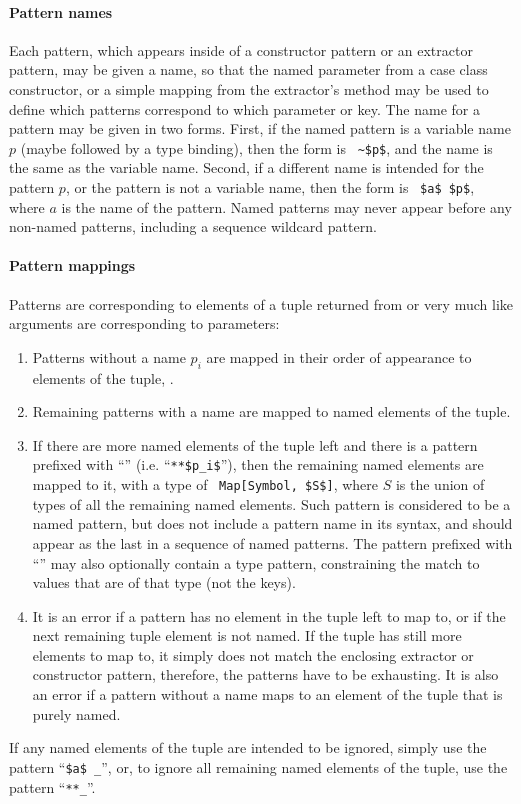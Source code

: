 \paragraph{Pattern names}
Each pattern, which appears inside of a constructor pattern or an extractor pattern, may be given a name, so that the named parameter from a case class constructor, or a simple mapping from the extractor's  method may be used to define which patterns correspond to which parameter or key. The name for a pattern may be given in two forms. First, if the named pattern is a variable name $p$ (maybe followed by a type binding), then the form is ~\lstinline!~$p$!, and the name is the same as the variable name. Second, if a different name is intended for the pattern $p$, or the pattern is not a variable name, then the form is ~\lstinline!$a$ $p$!, where $a$ is the name of the pattern. Named patterns may never appear before any non-named patterns, including a sequence wildcard pattern. 

\paragraph{Pattern mappings}
Patterns are corresponding to elements of a tuple returned from  or  very much like arguments are corresponding to parameters:
\begin{enumerate}
  \item Patterns without a name $p_i$ are mapped in their order of appearance to elements of the tuple, . 
  \item Remaining patterns with a name are mapped to named elements of the tuple. 
  \item If there are more named elements of the tuple left and there is a pattern prefixed with ``\code{**}'' (i.e. ``\lstinline!**$p_i$!''), then the remaining named elements are mapped to it, with a type of ~\lstinline!Map[Symbol, $S$]!, where $S$ is the union of types of all the remaining named elements. Such pattern is considered to be a named pattern, but does not include a pattern name in its syntax, and should appear as the last in a sequence of named patterns. The pattern prefixed with ``\code{**}'' may also optionally contain a type pattern, constraining the match to values that are of that type (not the keys). 
  \item It is an error if a pattern has no element in the tuple left to map to, or if the next remaining tuple element is not named. If the tuple has still more elements to map to, it simply does not match the enclosing extractor or constructor pattern, therefore, the patterns have to be exhausting. It is also an error if a pattern without a name maps to an element of the tuple that is purely named. 
\end{enumerate}
If any named elements of the tuple are intended to be ignored, simply use the pattern ``\lstinline!$a$ _!'', or, to ignore all remaining named elements of the tuple, use the pattern ``\lstinline!**_!''. 

